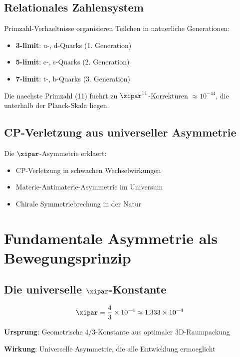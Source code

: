 	\subsection{Relationales Zahlensystem}
	
	Primzahl-Verhaeltnisse organisieren Teilchen in natuerliche Generationen:
	
	\begin{itemize}
		\item \textbf{3-limit}: u-, d-Quarks (1. Generation)
		\item \textbf{5-limit}: c-, s-Quarks (2. Generation)
		\item \textbf{7-limit}: t-, b-Quarks (3. Generation)
	\end{itemize}
	
	Die naechste Primzahl (11) fuehrt zu $\xipar^{11}$-Korrekturen $\approx 10^{-44}$, die unterhalb der Planck-Skala liegen.
	
	\subsection{CP-Verletzung aus universeller Asymmetrie}
	
	Die $\xipar$-Asymmetrie erklaert:
	\begin{itemize}
		\item CP-Verletzung in schwachen Wechselwirkungen
		\item Materie-Antimaterie-Asymmetrie im Universum
		\item Chirale Symmetriebrechung in der Natur
	\end{itemize}
	
	\section{Fundamentale Asymmetrie als Bewegungsprinzip}
	
	\subsection{Die universelle $\xipar$-Konstante}
	
	\begin{equation}
		\xipar = \frac{4}{3} \times 10^{-4} \approx 1.333 \times 10^{-4}
	\end{equation}
	
	\textbf{Ursprung}: Geometrische 4/3-Konstante aus optimaler 3D-Raumpackung
	
	\textbf{Wirkung}: Universelle Asymmetrie, die alle Entwicklung ermoeglicht
	
